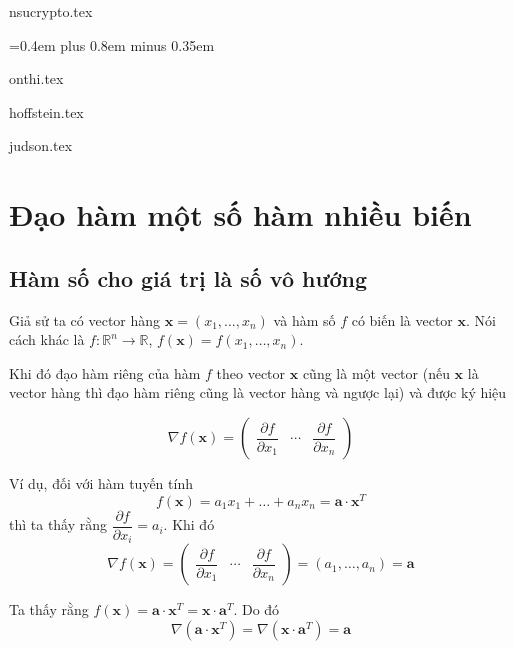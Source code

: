 \documentclass{mynotes}
\newcommand{\RR}{\mathbb{R}}
\begin{document}






{nsucrypto.tex}

{
 \spaceskip=0.4em plus 0.8em minus 0.35em
\printbibliography[env=gostbibliography,heading=bibintoc,title={Tài liệu tham khảo}]
}

\appendix

{onthi.tex}

{hoffstein.tex}

{judson.tex}

\chapter{Đạo hàm một số hàm nhiều biến}

\section*{Hàm số cho giá trị là số vô hướng}
	
Giả sử ta có vector hàng $\bm{x} = (x_1, \ldots, x_n)$ và hàm số $f$ có biến là vector $\bm{x}$. Nói cách khác là $f: \RR^n \to \RR$, $f(\bm{x}) = f(x_1, \ldots, x_n)$.

Khi đó đạo hàm riêng của hàm $f$ theo vector $\bm{x}$ cũng là một vector (nếu $\bm{x}$ là vector hàng thì đạo hàm riêng cũng là vector hàng và ngược lại) và được ký hiệu

\begin{equation*}
    \nabla f(\bm{x}) = \begin{pmatrix}
        \dfrac{\partial f}{\partial x_1} & \cdots & \dfrac{\partial f}{\partial x_n}
    \end{pmatrix}
\end{equation*}

Ví dụ, đối với hàm tuyến tính \[ f(\bm{x}) = a_1 x_1 + \ldots + a_n x_n = \bm{a} \cdot \bm{x}^T \] thì ta thấy rằng $\dfrac{\partial f}{\partial x_i} = a_i$. Khi đó \[ \nabla f (\bm{x}) = \begin{pmatrix}
    \dfrac{\partial f}{\partial x_1} & \cdots & \dfrac{\partial f}{\partial x_n}
\end{pmatrix} = (a_1, \ldots, a_n) = \bm{a}\]

Ta thấy rằng $f(\bm{x}) = \bm{a} \cdot \bm{x}^T = \bm{x} \cdot \bm{a}^T$. Do đó \[\nabla (\bm{a} \cdot \bm{x}^T) = \nabla (\bm{x} \cdot \bm{a}^T) = \bm{a}\]
\end{document}
